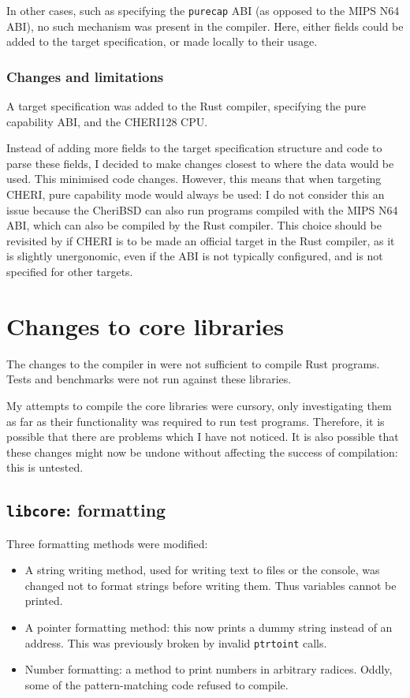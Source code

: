 \documentclass[dissertation.tex]{subfiles}
\begin{document}
In other cases, such as specifying the \texttt{purecap} ABI (as opposed
to the MIPS N64 ABI), no such mechanism was present in the compiler.
Here, either fields could be added to the target specification, or made
locally to their usage.


\subsubsection{Changes and limitations}
A target specification was added to the Rust compiler, specifying the
pure capability ABI, and the CHERI128 CPU.

Instead of adding more fields to the target specification structure and
code to parse these fields, I decided to make changes closest to where
the data would be used.
This minimised code changes.
However, this means that when targeting CHERI, pure capability mode
would always be used: I do not consider this an issue because the
CheriBSD can also run programs compiled with the MIPS N64 ABI, which can
also be compiled by the Rust compiler.
This choice should be revisited by if CHERI is to be made an official
target in the Rust compiler, as it is slightly unergonomic, even if the
ABI is not typically configured, and is not specified for other targets.


\section{Changes to core libraries}
\label{sec:impl-div-lib}

The changes to the compiler in  were not
sufficient to compile Rust programs.
Tests and benchmarks were not run against these libraries.

My attempts to compile the core libraries were cursory, only
investigating them as far as their functionality was required to run
test programs.
Therefore, it is possible that there are problems which I have not
noticed.
It is also possible that these changes might now be undone without
affecting the success of compilation: this is untested.

\subsection{\texttt{libcore}: formatting}
Three formatting methods were modified:

\begin{itemize}
    \item A string writing method, used for writing text to files or the
    console, was changed not to format strings before writing them.
    Thus variables cannot be printed.
    \item A pointer formatting method: this now prints a dummy string
    instead of an address.
    This was previously broken by invalid \texttt{ptrtoint} calls.
    \item Number formatting: a method to print numbers in arbitrary
    radices.
    Oddly, some of the pattern-matching code refused to compile.
\end{itemize}
\end{document}
